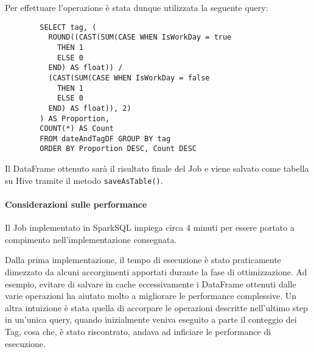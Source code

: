 \begin{itemize}
      Per effettuare l'operazione è stata dunque utilizzata la seguente query:

      \begin{verbatim}
        SELECT tag, (
          ROUND((CAST(SUM(CASE WHEN IsWorkDay = true
            THEN 1
            ELSE 0
          END) AS float)) /
          (CAST(SUM(CASE WHEN IsWorkDay = false
            THEN 1
            ELSE 0
          END) AS float)), 2)
        ) AS Proportion,
        COUNT(*) AS Count
        FROM dateAndTagDF GROUP BY tag
        ORDER BY Proportion DESC, Count DESC
      \end{verbatim}

    Il DataFrame ottenuto sarà il risultato finale del Job
    e viene salvato come tabella su Hive tramite il metodo \texttt{saveAsTable()}. %
  \end{itemize}

  \paragraph{Considerazioni sulle performance}\label{par:job1:spark:performance}

  Il Job implementato in SparkSQL impiega circa 4 minuti per essere portato a compimento nell'implementazione consegnata.

  Dalla prima implementazione, il tempo di esecuzione è stato praticamente dimezzato da alcuni accorgimenti apportati durante la fase di ottimizzazione.
  Ad esempio, evitare di salvare in cache eccessivamente i DataFrame ottenuti dalle varie operazioni ha aiutato molto a migliorare le performance complessive.
  Un altra intuizione è stata quella di accorpare le operazioni descritte nell'ultimo step in un'unica query, quando inizialmente
  veniva eseguito a parte il conteggio dei Tag, cosa che, è stato riscontrato, andava ad inficiare le performance di esecuzione.
